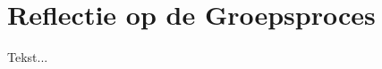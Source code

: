 \chapter[Reflectie op de Groepsproces]{Reflectie op de Groepsproces} \label {chapter:groepsproces}

	Tekst...
